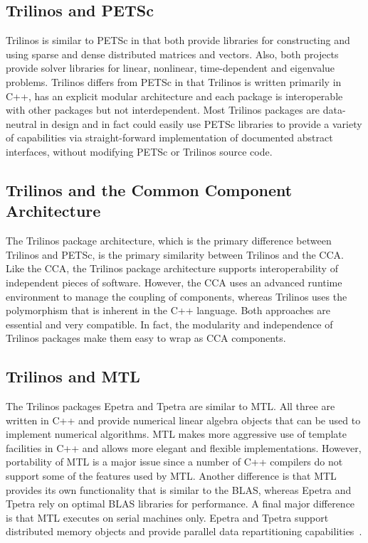 \documentclass[acmtoms,acmnow]{acmtrans2m}
\begin{document}
\subsection{Trilinos and PETSc}
Trilinos is similar to PETSc in that both provide libraries for
constructing and using sparse and dense distributed matrices and
vectors.  Also, both projects provide solver libraries for linear, nonlinear,
time-dependent and eigenvalue problems.  Trilinos differs from PETSc
in that Trilinos is written primarily in C++, has an explicit
modular architecture and each package is interoperable with other
packages but not interdependent.  Most Trilinos packages are
data-neutral in design and in fact could easily use PETSc libraries to
provide a variety of capabilities via straight-forward implementation
of documented abstract interfaces, without modifying PETSc or Trilinos source code.  

\subsection{Trilinos and the Common Component Architecture}
The Trilinos package architecture, which is the primary difference between
Trilinos and PETSc,
is the primary similarity between Trilinos and the CCA.  Like the CCA,
the Trilinos
package architecture supports interoperability of independent
pieces of software.  However, the CCA uses an advanced runtime
environment to manage the coupling of components, whereas Trilinos
uses the polymorphism that is inherent in the C++ language.  Both
approaches are essential and very compatible.  In fact, the modularity
and independence of Trilinos
packages make them easy to wrap as CCA components.

\subsection{Trilinos and MTL}
The Trilinos packages Epetra and Tpetra are similar to MTL.  All three
are written in C++ and provide numerical linear algebra objects
that can be used to implement numerical algorithms.  MTL
makes more aggressive use of template facilities in C++ and allows
more elegant and flexible implementations.  However, portability of
MTL is a major issue since a number of C++ compilers do not 
support some of
the features used by MTL.  Another difference is that MTL provides its
own functionality that is similar to the BLAS, whereas Epetra and
Tpetra rely on optimal BLAS libraries for performance.  A final
major difference is that MTL executes on serial machines only.  
Epetra and Tpetra support distributed
memory objects and provide parallel data repartitioning
capabilities~\cite{Repartitioning}.
\end{document}
